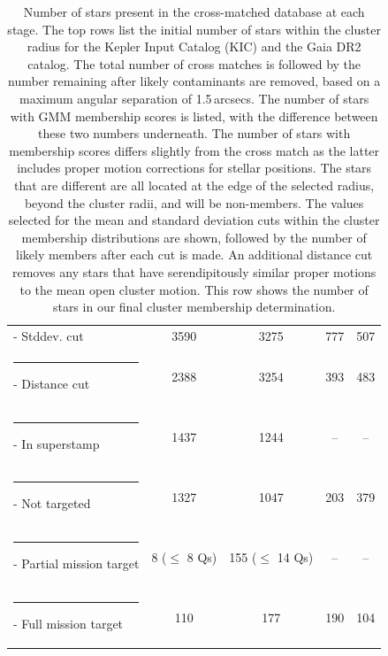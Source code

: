 \begin{table}[p]
\begin{tabular}{lcccc}
         - Stddev. cut & 3590 & 3275 & 777 & 507 \\\rule{-3pt}{1.2em}
         - Distance cut & 2388 & 3254 & 393 & 483 \\\rule{-3pt}{1.2em}
         - In superstamp & 1437 & 1244 & -- & -- \\\rule{-3pt}{1.2em}
         - Not targeted & 1327 & 1047 & 203 & 379 \\\rule{-3pt}{1.2em}
         - Partial mission target & 8 ($\leq$ 8 Qs) & 155 ($\leq$ 14 Qs) & -- & -- \\\rule{-3pt}{1.2em}
         - Full mission target & 110 & 177 & 190 & 104 \\
        \bottomrule
    \end{tabular}
    \caption[Number of stars present in the cross-matched database at each stage]{Number of stars present in the cross-matched database at each stage. The top rows list the initial number of stars within the cluster radius for the Kepler Input Catalog (KIC) and the Gaia DR2 catalog. The total number of cross matches is followed by the number remaining after likely contaminants are removed, based on a maximum angular separation of 1.5\,arcsecs. The number of stars with GMM membership scores is listed, with the difference between these two numbers underneath. The number of stars with membership scores differs slightly from the cross match as the latter includes proper motion corrections for stellar positions. The stars that are different are all located at the edge of the selected radius, beyond the cluster radii, and will be non-members. The values selected for the mean and standard deviation cuts within the cluster membership distributions are shown, followed by the number of likely members after each cut is made. An additional distance cut removes any stars that have serendipitously similar proper motions to the mean open cluster motion. This row shows the number of stars in our final cluster membership determination.}
    \label{tab:cluster_crossmatch}
\end{table}



